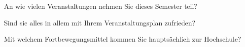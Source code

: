 %
%
%



\separate

\begin{choicequestion}[6]{An wie vielen Veranstaltungen nehmen Sie dieses Semester teil?}
\end{choicequestion}

\separate

\begin{choicequestion}[1]{Sind sie alles in allem mit Ihrem Veranstaltungsplan zufrieden?}
\end{choicequestion}

\separate

\begin{choicequestion}[1]{Mit welchem Fortbewegungsmittel kommen Sie hauptsächlich zur Hochschule?}
\end{choicequestion}
